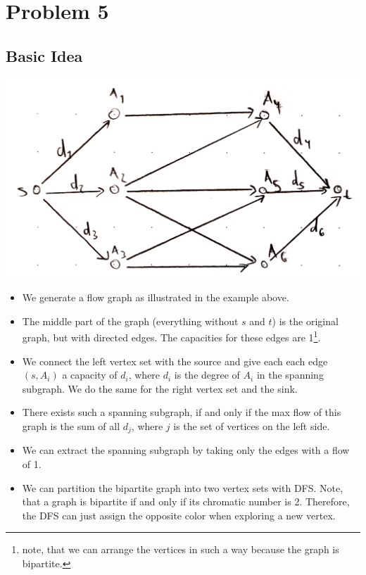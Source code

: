\documentclass[12pt]{article}
\begin{document}
\section*{Problem 5}
\subsection*{Basic Idea}
\includegraphics[width=\textwidth]{5.pdf}

\begin{itemize}
	\item We generate a flow graph as illustrated in the example above.
	\item The middle part of the graph (everything without $s$ and $t$) is the original graph, but with directed edges. The capacities for these edges are 1\footnote{note, that we can arrange the vertices in such a way because the graph is bipartite.}.
	\item We connect the left vertex set with the source and give each each edge $(s, A_i)$ a capacity of $d_i$, where $d_i$ is the degree of $A_i$ in the spanning subgraph. We do the same for the right vertex set and the sink.
	\item There exists such a spanning subgraph, if and only if the max flow of this graph is the sum of all $d_j$, where $j$ is the set of vertices on the left side.
	\item We can extract the spanning subgraph by taking only the edges with a flow of 1.
	\item We can partition the bipartite graph into two vertex sets with DFS. Note, that a graph is bipartite if and only if its chromatic number is 2. Therefore, the DFS can just assign the opposite color when exploring a new vertex.
\end{itemize}
\end{document}
